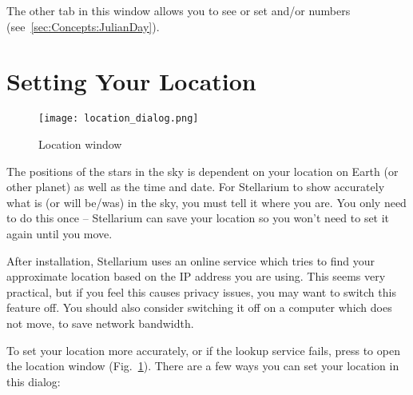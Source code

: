 The other tab in this window allows you to see or set
 and/or  numbers
(see~\ref{sec:Concepts:JulianDay}).

\section{Setting Your Location}
\label{sec:gui:location}

\begin{figure}[htbp]
\centering\texttt{[image: location\_dialog.png]}
\caption{Location window}
\label{fig:gui:location}
\end{figure}

\noindent The positions of the stars in the sky is dependent on your location on
Earth (or other planet) as well as the time and date. For Stellarium to
show accurately what is (or will be/was) in the sky, you must tell it
where you are. You only need to do this once -- Stellarium can save your
location so you won't need to set it again until you move.

After installation, Stellarium uses an online service which tries to
find your approximate location based on the IP address you are
using. This seems very practical, but if you feel this causes privacy
issues, you may want to switch this feature off. You should also consider 
switching it off on a computer which does not move, to save network bandwidth.

To set your location more accurately, or if the lookup service fails,
press  to open the location window (Fig.~\ref{fig:gui:location}). 
There are a few ways you can set your location in this dialog:

